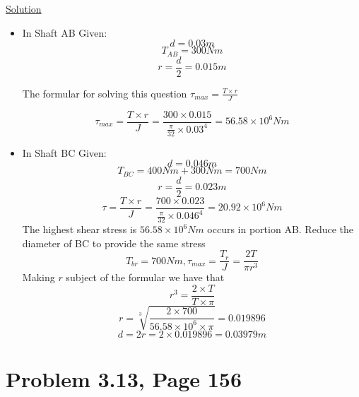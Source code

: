 \documentclass{article}
\begin{document}
\begin{center}\underline{Solution}\end{center}
\begin{itemize}
\item  In Shaft AB\newline
Given: \[d = 0.03m\]\[T_{AB} = 300Nm\]\[r = \frac{d}{2} = 0.015m\]\newline
\begin{center}The formular for solving this question $\tau_{max} = \frac{T\times r}{J}$\end{center}
\[\tau_{max} = \frac{T\times r}{J} = \frac{300\times0.015}{\frac{\pi}{32}\times {0.03}^{4}} = 56.58\times10^{6}Nm\]
\item In Shaft BC \newline
Given: \[d = 0.046m\]\[T_{BC} = 400Nm + 300Nm = 700Nm\]\[r = \frac{d}{2} = 0.023m\]\newline
\[\tau = \frac{T\times r}{J} = \frac{700\times0.023}{\frac{\pi}{32}\times {0.046}^{4}} = 20.92\times10^{6}Nm\]
The highest shear stress is $ 56.58\times10^{6}Nm$ occurs in portion AB. Reduce the diameter of BC to provide the same stress
 \[T_{br} = 700Nm, \tau_{max} = \frac{T_{r}}{J} = \frac{2T}{\pi r^{3}}\]
Making $r $ subject of the formular we have that \[r^{3} = \frac{2\times T}{T\times\pi}\]
\[r = \sqrt[3]{\frac{2\times700}{56.58\times10^{6}\times\pi}} = 0.019896\]
\[d = 2r = 2\times0.019896 = 0.03979m\]

\end{itemize}


\section*{Problem 3.13, Page 156}
\end{document}
